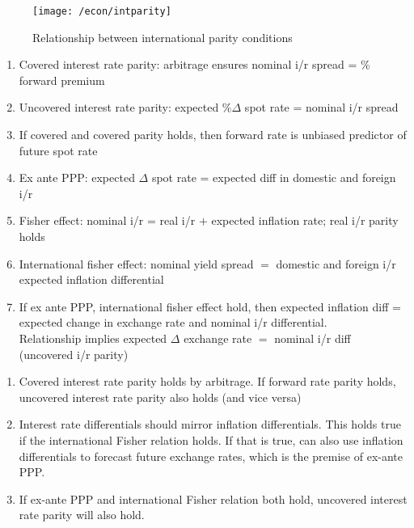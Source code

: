 \begin{figure}[H]
\centering
\texttt{[image: /econ/intparity]}
\caption{Relationship between international parity conditions}
\end{figure}

\begin{remark} 
\begin{enumerate}[label=\roman*.]
\setlength{\itemsep}{0pt}
\item Covered interest rate parity: arbitrage ensures nominal i/r spread = \% forward premium
\item Uncovered interest rate parity: expected $\% \Delta$ spot rate = nominal i/r spread
\item If covered and covered parity holds, then forward rate is unbiased predictor of future spot rate
\item Ex ante PPP: expected $\Delta$ spot rate = expected diff in domestic and foreign i/r
\item Fisher effect: nominal i/r = real i/r $+$ expected inflation rate; real i/r parity holds
\item International fisher effect: nominal yield spread $=$ domestic and foreign i/r expected inflation differential
\item If ex ante PPP, international fisher effect hold, then expected inflation diff = expected change in exchange rate and nominal i/r differential.\\
Relationship implies expected $\Delta$ exchange rate $=$ nominal i/r diff (uncovered i/r parity)
\end{enumerate}
\end{remark}

\begin{remark} 
\begin{enumerate}[label=\roman*.]
\setlength{\itemsep}{0pt}
\item Covered interest rate parity holds by arbitrage. If forward rate parity holds, uncovered interest rate parity also holds (and vice versa)
\item Interest rate differentials should mirror inflation differentials. This holds true if the international Fisher relation holds. If that is true, can also use inflation differentials to forecast future exchange rates, which is the premise of ex-ante PPP.
\item If ex-ante PPP and international Fisher relation both hold, uncovered interest rate parity will also hold.
\end{enumerate}
\end{remark}

